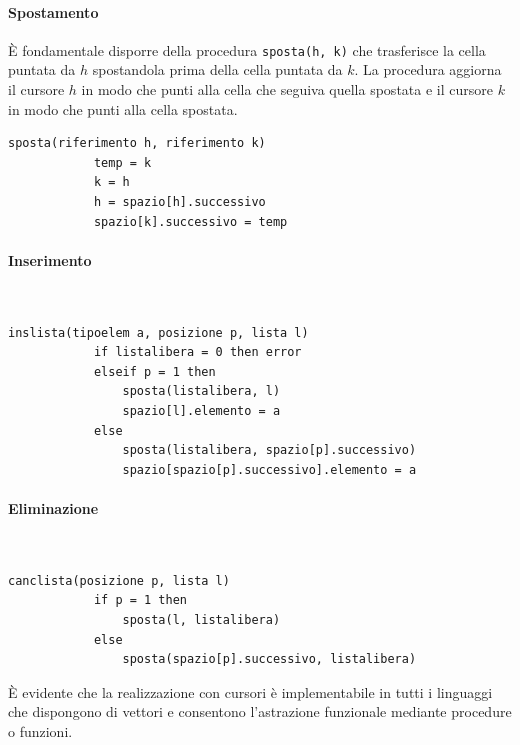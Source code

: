 \documentclass[12pt]{report}
\begin{document}
	\paragraph{Spostamento} È fondamentale disporre della procedura \texttt{sposta(h, k)} che trasferisce la cella puntata da $h$ spostandola prima della cella puntata da $k$. La procedura aggiorna il cursore $h$ in modo che punti alla cella che seguiva quella spostata e il cursore $k$ in modo che punti alla cella spostata.
	\begin{lstlisting}[style=normalstyle]
		sposta(riferimento h, riferimento k)
			temp = k
			k = h
			h = spazio[h].successivo
			spazio[k].successivo = temp
	\end{lstlisting}
	\paragraph{Inserimento} \quad \\
	\begin{lstlisting}[style=normalstyle]
		inslista(tipoelem a, posizione p, lista l)
			if listalibera = 0 then error
			elseif p = 1 then
				sposta(listalibera, l)
				spazio[l].elemento = a
			else
				sposta(listalibera, spazio[p].successivo)
				spazio[spazio[p].successivo].elemento = a
	\end{lstlisting}
	\paragraph{Eliminazione} \quad \\
	\begin{lstlisting}[style=normalstyle]
		canclista(posizione p, lista l)
			if p = 1 then
				sposta(l, listalibera)
			else
				sposta(spazio[p].successivo, listalibera)
	\end{lstlisting}
	È evidente che la realizzazione con cursori è implementabile in tutti i linguaggi che dispongono di vettori e consentono l'astrazione funzionale mediante procedure o funzioni.
\end{document}
